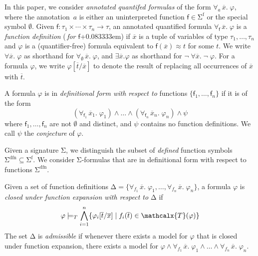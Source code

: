 \documentclass[runningheads,a4paper]{llncs}
\newcommand\DDD{\Delta}
\newcommand{\con}[1]{\mathsf{#1}}
\renewcommand\vec[1]{\overline{#1}}
\let\oldSigma=\Sigma
\def\Sigma{\mathrm{\oldSigma}}
\let\oldDelta=\Delta
\def\Delta{\mathrm{\oldDelta}}
\let\oldneg=\neg
\def\neg{\oldneg\;}
\let\oldwedge=\wedge
\def\wedge{\mathrel{\oldwedge}}
\newcommand{\teq}{\approx}
\newcommand{\terms}{\mathcalx{T}}
\newcommand{\sfuns}[1]{#1^\mathrm{f}}
\newcommand{\sfundefs}[1]{#1^\mathrm{dfn}}
\newcommand{\forallf}[1]{\forall_{\!#1\:}}
\newcommand{\fnull}{\emptyset}
\newcommand{\rem}[1]{\textcolor{red}{[#1]}}
\newcommand{\ct}[1]{\rem{#1 --ct}}
\newcommand{\vthinspace}{\kern+0.083333em}
\begin{document}
In this paper, we consider \emph{annotated quantifed formulas} of the form
$\forallf{a} \vec x.\; \varphi$, where the annotation~$a$ is either
an uninterpreted function $\con{f} \in \sfuns{\Sigma}$ or the special symbol
$\fnull$.
Given $\con{f} : \tau_1 \times \cdots \times \tau_n \rightarrow \tau$,
an annotated
quantified formula $\forallf{\con{f}} \vec x.\; \varphi$ is a \emph{function definition}
(\,\emph{for $\con{f}$}\vthinspace) if $\vec x$ is a tuple of variables of type
$\tau_1, \ldots, \tau_n$ and $\varphi$ is a (quantifier-free) formula equivalent to
$\con{f}( \vec x ) \teq t$ for some $t$. We write $\forall \vec
x.\; \varphi$ as shorthand for $\forallf{\fnull} \vec x.\; \varphi$, and $\exists
\vec x. \varphi$ as shorthand for $\neg \forall \vec x.\; \neg \varphi$.
For a formula $\varphi$,
we write $\varphi[\vec t/\vec x]$ to denote the result of replacing all occurrences of $\vec x$ with $\vec t$.

\begin{definition}%
\rm
A formula $\varphi$ is in \emph{definitional form with respect to} functions $\{
\con{f}_1, \ldots, \con{f}_n \}$ if it is of the form
%
%
\begin{equation} \label{eq:wdf}
(\forallf{\con{f}_1} \vec x_1.\; \varphi_1) \wedge \ldots \wedge (\forallf{\con{f}_n} \vec x_n.\; \varphi_n) \wedge \psi
\end{equation}
%
where $\con{f}_1, \ldots, \con{f}_n$ are not $\fnull$ and distinct,
and $\psi$ contains no function definitions.
We call $\psi$ the \emph{conjecture} of $\varphi$.
\end{definition}

Given a signature $\Sigma$,
we distinguish the subset of \emph{defined} function symbols $\sfundefs{\Sigma}
\subseteq \sfuns{\Sigma}$.
We consider $\Sigma$-formulas that are in definitional form with respect to
functions $\sfundefs{\Sigma}$.

\begin{definition}
Given a set of function definitions $\DDD = \{ \forallf{f_1} \vec x.\; \varphi_1, \ldots, \forallf{f_n} \vec x.\; \varphi_n \}$,
a formula $\varphi$ is \emph{closed under function expansion with respect to $\DDD$} if
\begin{eqnarray}
\varphi \models_T \bigwedge_{i=1}^n \{ \varphi_i[ \vec t / \vec x ] \mid f_i( \vec t ) \in \terms( \varphi ) \}
\end{eqnarray}
The set $\DDD$ is \emph{admissible} if whenever there exists a model for $\varphi$ that is closed under function expansion,
there exists a model for $\varphi \wedge \forallf{f_1} \vec x.\; \varphi_1 \wedge \ldots \wedge \forallf{f_n} \vec x.\; \varphi_n$.
\end{definition}
\end{document}
